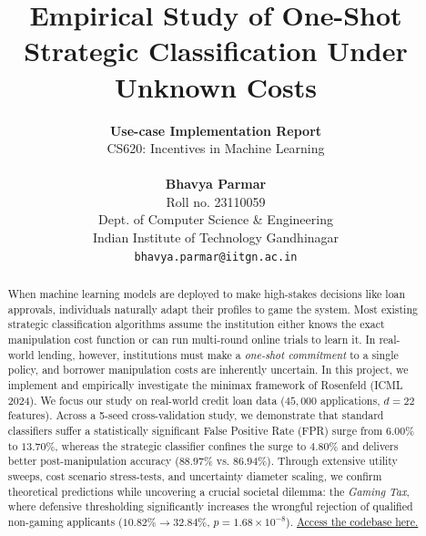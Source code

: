 \documentclass[10pt, letterpaper]{article}
\date{}
\begin{document}
\title{\textbf{\Large Empirical Study of One-Shot Strategic Classification Under Unknown Costs}}

\author{
  \textbf{Use-case Implementation Report}\\
  CS620: Incentives in Machine Learning\\
  \\
  \textbf{Bhavya Parmar}\\
  Roll no. 23110059\\
  Dept. of Computer Science \& Engineering\\
  Indian Institute of Technology Gandhinagar\\
  \texttt{bhavya.parmar@iitgn.ac.in}
}

\maketitle

\begin{abstract}
When machine learning models are deployed to make high-stakes decisions like loan approvals, individuals naturally adapt their profiles to game the system. Most existing strategic classification algorithms assume the institution either knows the exact manipulation cost function or can run multi-round online trials to learn it. In real-world lending, however, institutions must make a \emph{one-shot commitment} to a single policy, and borrower manipulation costs are inherently uncertain. In this project, we implement and empirically investigate the minimax framework of Rosenfeld (ICML 2024). We focus our study on real-world credit loan data ($45{,}000$ applications, $d=22$ features). Across a 5-seed cross-validation study, we demonstrate that standard classifiers suffer a statistically significant False Positive Rate (FPR) surge from $6.00\%$ to $13.70\%$, whereas the strategic classifier confines the surge to $4.80\%$ and delivers better post-manipulation accuracy ($88.97\%$ vs. $86.94\%$). Through extensive utility sweeps, cost scenario stress-tests, and uncertainty diameter scaling, we confirm theoretical predictions while uncovering a crucial societal dilemma: the \emph{Gaming Tax}, where defensive thresholding significantly increases the wrongful rejection of qualified non-gaming applicants ($10.82\% \to 32.84\%$, $p = 1.68 \times 10^{-8}$). \href{https://github.com/bhavya-parmar/OSSC.git}{Access the codebase here.}
\end{abstract}
\end{document}
